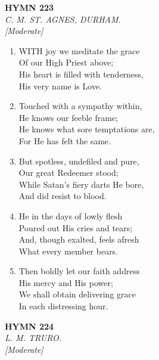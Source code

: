 \newpage
\begin{center}
    {\Large \textbf{HYMN 223}}
    \\
    \textit{C. M. ST. AGNES, DURHAM.}
    \\
    \textit{\small [Moderate]}
\end{center}
\vspace{1em}

\begin{enumerate}
    \item WITH joy we meditate the grace \\
            Of our High Priest above; \\
        His heart is filled with tenderness, \\
            His very name is Love.

    \item Touched with a sympathy within, \\
            He knows our feeble frame; \\
        He knows what sore temptations are, \\
            For He has felt the same.

    \item But spotless, undefiled and pure, \\
            Our great Redeemer stood; \\
        While Satan's fiery darts He bore, \\
            And did resist to blood.

    \item He in the days of lowly flesh \\
            Poured out His cries and tears; \\
        And, though exalted, feels afresh \\
            What every member bears.

    \item Then boldly let our faith address \\
            His mercy and His power; \\
        We shall obtain delivering grace \\
            In each distressing hour.

\end{enumerate}

\newpage
\begin{center}
    {\Large \textbf{HYMN 224}}
    \\
    \textit{L. M. TRURO.}
    \\
    \textit{\small [Moderate]}
\end{center}
\vspace{1em}

